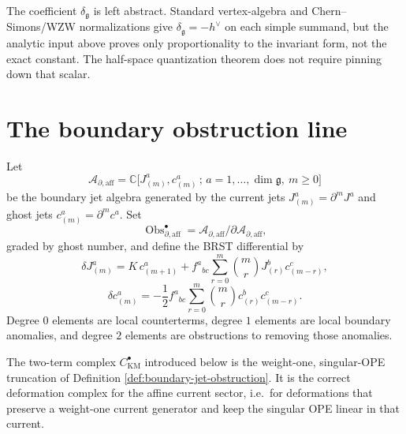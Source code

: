 \begin{remark}
The coefficient $\delta_{\mathfrak g}$ is left abstract. Standard vertex-algebra and
Chern--Simons/WZW normalizations give
$\delta_{\mathfrak g}=-h^{\vee}$ on each simple summand, but the analytic input above proves only
proportionality to the invariant form, not the exact constant.
The half-space quantization theorem does not require pinning down that scalar.
\end{remark}

\section{The boundary obstruction line}

\begin{definition}\label{def:boundary-jet-obstruction}
Let
\[
\mathcal A_{\partial,\mathrm{aff}}
=
\mathbb C\bigl[J^a_{(m)},c^a_{(m)} \,;\, a=1,\dots,\dim\mathfrak g,\ m\ge 0\bigr]
\]
be the boundary jet algebra generated by the current jets
$J^a_{(m)}=\partial^m J^a$ and ghost jets $c^a_{(m)}=\partial^m c^a$.
Set
\[
\operatorname{Obs}^{\bullet}_{\partial,\mathrm{aff}}
=
\mathcal A_{\partial,\mathrm{aff}}/\partial \mathcal A_{\partial,\mathrm{aff}},
\]
graded by ghost number, and define the BRST differential by
\[
\delta J^a_{(m)}
=
K\,c^a_{(m+1)}
+
f^a{}_{bc}\sum_{r=0}^{m}\binom{m}{r}J^b_{(r)}c^c_{(m-r)},
\]
\[
\delta c^a_{(m)}
=
-\frac12 f^a{}_{bc}\sum_{r=0}^{m}\binom{m}{r}c^b_{(r)}c^c_{(m-r)}.
\]
Degree $0$ elements are local counterterms, degree $1$ elements are local boundary anomalies, and degree $2$
elements are obstructions to removing those anomalies.
\end{definition}

\begin{remark}
The two-term complex $C^{\bullet}_{\mathrm{KM}}$ introduced below is the weight-one, singular-OPE truncation of
Definition \ref{def:boundary-jet-obstruction}. It is the correct deformation complex for the affine
current sector, i.e.\ for deformations that preserve a weight-one current generator and keep the singular OPE
linear in that current.
\end{remark}

